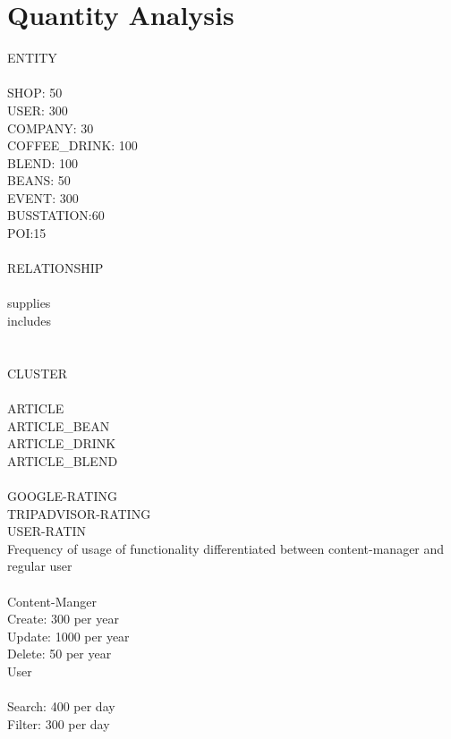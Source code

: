 \section{Quantity Analysis}
ENTITY\\\\
SHOP: 50\\ 
USER: 300\\
COMPANY: 30\\
COFFEE\_DRINK: 100\\
BLEND: 100\\
BEANS: 50\\
EVENT: 300\\
BUSSTATION:60\\
POI:15\\\\
RELATIONSHIP\\\\
supplies\\
includes\\
\\\\
CLUSTER\\\\
ARTICLE\\
ARTICLE\_BEAN\\
ARTICLE\_DRINK\\
ARTICLE\_BLEND\\\\
GOOGLE-RATING\\
TRIPADVISOR-RATING\\
USER-RATIN\\



Frequency of usage of functionality differentiated between content-manager and regular user\\\\
Content-Manger\\
Create:	300 per year\\ 
Update: 1000 per year\\
Delete: 50 per year \\
User\\\\
Search: 400 per day\\
Filter:	300 per day \\